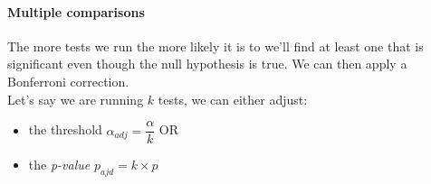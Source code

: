 \paragraph{Multiple comparisons}
The more tests we run the more likely it is to we'll find at least one that is significant
even though the null hypothesis is true. We can then apply a Bonferroni correction.\\
Let's say we are running $k$ tests, we can either adjust: 
\begin{itemize}
	\item the threshold $\alpha_{adj} = \dfrac{\alpha}{k}$ OR
	\item the \emph{p-value} $p_{ajd} = k\times p$
\end{itemize}


